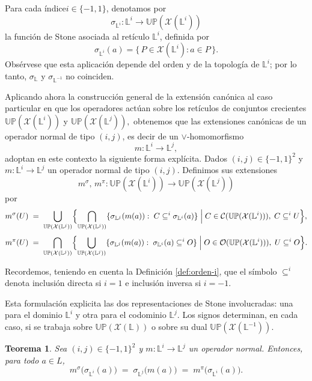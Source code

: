 \documentclass[12pt]{book}
\newtheorem{theorem}{Teorema}[section]
\newcommand{\Up}{\mathbb{UP}}
\begin{document}
\smallskip

Para cada índice\(i\in\{-1,1\}\), denotamos por
\[
  \sigma_{\mathbb{L}^i}\colon
  \mathbb{L}^i\longrightarrow
  \Up(\mathcal{X}(\mathbb{L}^i))
\]
la función de Stone asociada al retículo \(\mathbb{L}^i\), definida por
\[
  \sigma_{\mathbb{L}^i}(a)
  =\{\,P\in\mathcal{X}(\mathbb{L}^i): a\in P\,\}.
\]
Obsérvese que esta aplicación depende del orden y de la topología de 
\(\mathbb{L}^i\); por lo tanto, \(\sigma_{\mathbb L}\) y 
\(\sigma_{\mathbb L^{-1}}\) no coinciden.

\smallskip

Aplicando ahora la construcción general de la extensión canónica al caso
particular en que los operadores actúan sobre los retículos de conjuntos
crecientes
\(
\Up(\mathcal{X}(\mathbb{L}^i))
\)
y
\(
\Up(\mathcal{X}(\mathbb{L}^j)),
\)
obtenemos que las extensiones canónicas de un operador normal de tipo $(i,j)$,
es decir de un \(\vee\)-homomorfismo
\[
m\colon \mathbb L^i \longrightarrow \mathbb L^j,
\]
adoptan en este contexto la siguiente forma explícita. Dados $(i,j)\in\{-1,1\}^2$ y
\(m\colon \mathbb L^i \to \mathbb L^j\)
un operador normal de tipo \((i,j)\).
Definimos sus extensiones
\[
  m^{\sigma},\,m^{\pi} :
  \Up(\mathcal{X}(\mathbb{L}^i))
  \longrightarrow
  \Up(\mathcal{X}(\mathbb{L}^j))
\]
por
\[
  m^{\sigma}(U)
  \;=\;
  \bigcup_{\Up(\mathcal{X}(\mathbb L^j))}
  \Bigl\{
    \bigcap_{\Up(\mathcal{X}(\mathbb L^j))}
      \{\sigma_{\mathbb L^j}(m(a)):\;C\subseteq^{i}\sigma_{\mathbb L^i}(a)\}
    \;\Big|\;
    C\in\mathcal C({\Up(\mathcal{X}(\mathbb L^i))}),\;
    C\subseteq^{i} U
  \Bigr\},
\]
\[
  m^{\pi}(U)
  \;=\;
  \bigcap_{\Up(\mathcal{X}(\mathbb L^j))}
  \Bigl\{
    \bigcup_{\Up(\mathcal{X}(\mathbb L^j))}
      \{\sigma_{\mathbb L^j}(m(a)):\;\sigma_{\mathbb L^i}(a)\subseteq^{i} O\}
    \;\Big|\;
    O\in\mathcal O(\Up(\mathcal{X}(\mathbb L^i))),\;
    U\subseteq^{i} O
  \Bigr\}.
\]

\noindent
Recordemos, teniendo en cuenta la Definición \ref{def:orden-i}, que el símbolo $\subseteq^i$ denota inclusión directa si $i=1$
e inclusión inversa si $i=-1$.

Esta formulación explicita las dos representaciones de Stone
involucradas: una para el dominio \(\mathbb{L}^i\) y otra para el codominio \(\mathbb{L}^j\). 
Los signos determinan, en cada caso, si se trabaja sobre
\(\Up(\mathcal{X}(\mathbb{L}))\) o sobre su dual
\(\Up(\mathcal{X}(\mathbb{L}^{-1}))\). 

\begin{theorem}\label{thm:extiende-en-basicos-ij-directo}
Sea $(i,j)\in\{-1,1\}^2$ y
\(m\colon\mathbb L^i\to\mathbb L^j\) un operador normal.
Entonces, para todo \(a\in L\),
\[
  m^{\sigma}\bigl(\sigma_{\mathbb{L}^i}(a)\bigr)
  \;=\;
  \sigma_{\mathbb{L}^j}\bigl(m(a)\bigr)
  \;=\;
  m^{\pi}\bigl(\sigma_{\mathbb{L}^i}(a)\bigr).
\]
\end{theorem}
\end{document}
